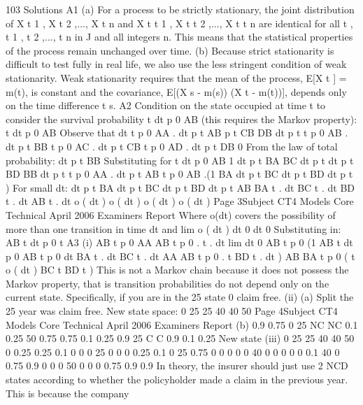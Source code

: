 \documentclass[a4paper,12pt]{article}
\begin{document}
\begin{enumerate}
{103 Solutions
A1
(a)
For a process to be strictly stationary, the joint distribution of X t 1 , X t 2 ,..., X t n
and X t
t 1 , X t t 2 ,..., X t t n
are identical for all t , t 1 , t 2 ,..., t n in J and all integers
n.
This means that the statistical properties of the process remain unchanged over
time.
(b)
Because strict stationarity is difficult to test fully in real life, we also use the
less stringent condition of weak stationarity.
Weak stationarity requires that the mean of the process, E[X t ] = m(t), is
constant and the covariance, E[(X s - m(s)) (X t - m(t))], depends only on the
time difference t s.
A2
Condition on the state occupied at time t to consider the survival probability
t dt
p 0 AB (this requires the Markov property):
t dt
p 0 AB
Observe that
dt
t
p 0 AA . dt p t AB
p t CB
DB
dt p t
t
p 0 AB . dt p t BB
t
p 0 AC . dt p t CB
t
p 0 AD . dt p t DB
0
From the law of total probability:
dt
p t BB
Substituting for
t dt
p 0 AB
1
dt
p t BA
BC
dt p t
dt
p t BD
BB
dt p t
t
p 0 AA . dt p t AB
t
p 0 AB .(1
BA
dt p t
BC
dt p t
BD
dt p t )
For small dt:
dt p t BA
dt p t BC
dt p t BD
dt p t AB
BA
t . dt
BC
t . dt
BD
t . dt
AB
t . dt
o ( dt )
o ( dt )
o ( dt )
o ( dt )
Page 3Subject CT4
Models Core Technical
April 2006
Examiners Report
Where o(dt) covers the possibility of more than one transition in time dt and
lim o ( dt )
dt 0 dt
0
Substituting in:
AB
t dt p 0
t
A3
(i)
AB
t p 0
AA AB
t p 0 . t . dt
lim
dt
0
AB
t p 0 (1
AB
t dt p 0
AB
t p 0
dt
BA
t . dt
BC
t . dt
AA AB
t p 0 . t
BD
t . dt )
AB BA
t p 0 ( t
o ( dt )
BC
t
BD
t )
This is not a Markov chain because it does not possess the Markov property,
that is transition probabilities do not depend only on the current state.
Specifically, if you are in the 25%
state 0%
claim free.
(ii)
(a)
Split the 25%
year was claim free.
New state space:
0%
25%
25%
40%
40%
50%
Page 4Subject CT4
Models Core Technical
April 2006
Examiners Report
(b)
0.9
0.75
0%
25%
NC NC
0.1
0.25
50%
0.75
0.75
0.1
0.25
0.9
25%
C C
0.9
0.1
0.25
New state
(iii)
0%
25%
25%
40%
40%
50%
0%
0.25
0.25
0.1
0
0
0
25%
0
0
0
0.25
0.1
0
25%
0.75
0
0
0
0
0
40%
0
0
0
0
0
0.1
40%
0
0.75
0.9
0
0
0
50%
0
0
0
0.75
0.9
0.9
In theory, the insurer should just use 2 NCD states according to whether the
policyholder made a claim in the previous year. This is because the company
}
\end{enumerate}
\end{document}
